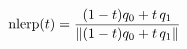 \documentclass[preview]{standalone}
\begin{document}
\begin{align*}
\special{dvisvgm:raw <g id='unique000'>}\mathrm{nlerp}(t)=\frac{(1-t)q_0+t\,q_1}{\lVert (1-t)q_0+t\,q_1\rVert}\special{dvisvgm:raw </g>}
\end{align*}
\end{document}
